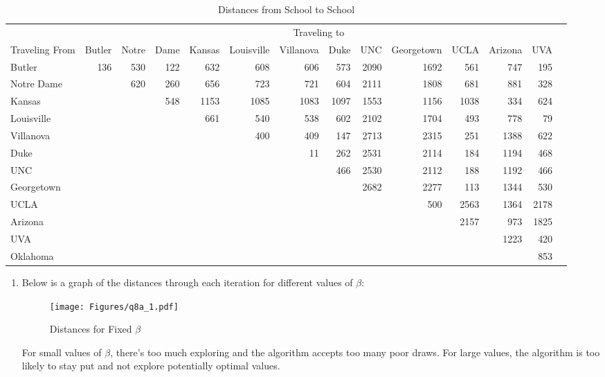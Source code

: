 \documentclass[12pt]{article}
\theoremstyle{plain}
\theoremstyle{definition}
\theoremstyle{remark}
\begin{document}
\begin{enumerate}
    \clearpage
    \begin{landscape}
    \begin{table}
      \caption{Distances from School to School}
      \label{table:data}
      \scriptsize
      \centering
      \begin{tabular}{l|rrrrrrrrrrrrr}
      & \multicolumn{12}{|c}{Traveling to} \\
      Traveling From &
      Butler&Notre&Dame&Kansas&Louisville&Villanova&Duke&UNC&Georgetown&UCLA&Arizona&UVA\\\hline\hline
      Butler & 136&530& 122& 632& 608& 606& 573& 2090& 1692& 561& 747& 195 \\
      Notre Dame && 620& 260& 656& 723& 721& 604& 2111& 1808& 681& 881& 328\\
      Kansas &&&548& 1153& 1085& 1083& 1097& 1553& 1156& 1038& 334& 624\\
      Louisville &&&& 661& 540& 538& 602& 2102& 1704& 493& 778& 79\\
      Villanova &&&&& 400& 409& 147& 2713& 2315& 251& 1388& 622\\
      Duke &&&&&& 11& 262& 2531& 2114& 184& 1194& 468\\
      UNC &&&&&&& 466& 2530& 2112& 188& 1192& 466\\
      Georgetown &&&&&&&& 2682& 2277& 113& 1344& 530\\
      UCLA &&&&&&&&& 500& 2563& 1364& 2178\\
      Arizona &&&&&&&&&& 2157& 973& 1825\\
      UVA &&&&&&&&&&& 1223& 420\\
      Oklahoma &&&&&&&&&&&& 853\\
      \end{tabular}
    \end{table}
    \end{landscape}

    \begin{enumerate}
      \item Below is a graph of the distances through each iteration for
      different values of $\beta$:
      \begin{figure}[htpb!]
        \centering
        \caption{Distances for Fixed $\beta$}
        \label{fig:q8a.1}
        \texttt{[image: Figures/q8a\_1.pdf]}
      \end{figure}
      For small values of $\beta$, there's too much exploring and the
      algorithm accepts too many poor draws. For large values, the
      algorithm is too likely to stay put and not explore potentially
      optimal values.


\end{enumerate}
\end{enumerate}
\end{document}
